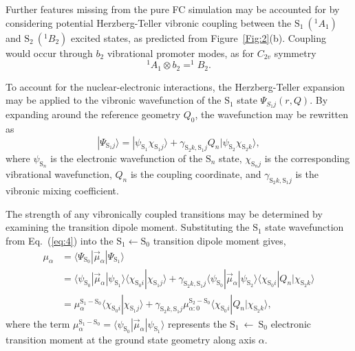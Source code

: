 \documentclass[journal=jpcafh,manuscript=article,layout=onecolumn, 12pt]{achemso}
\begin{document}
Further features missing from the pure FC simulation may be accounted for by considering potential Herzberg-Teller vibronic coupling between the $\text{S}_1~(^1A_1)$ and $\text{S}_2~(^1B_2)$ excited states, as predicted from Figure~\ref{Fig:2}(b). Coupling would occur through $b_2$ vibrational promoter modes, as for $C_{2v}$ symmetry
\begin{equation}
^1A_1 \otimes b_2 = ^1B_2.
\label{eq:3}
\end{equation}

To account for the nuclear-electronic interactions, the Herzberg-Teller expansion may be applied to the vibronic wavefunction of the $\text{S}_1$ state $\Psi_{S_1j}(r,Q)$. By expanding around the reference geometry $Q_0$, the wavefunction may be rewritten as 
\begin{equation}
|\Psi_{\text{S}_1j} \rangle = |\psi_{\text{S}_1} \chi_{\text{S}_1j} \rangle + \gamma_{\text{S}_2k,\text{S}_1j}Q_n|\psi_{\text{S}_2} \chi_{\text{S}_2k}\rangle, 
\label{eq:4}
\end{equation}
where $\psi_{\text{S}_n}$ is the electronic wavefunction of the $\text{S}_n$ state, $\chi_{\text{S}_nj}$ is the corresponding vibrational wavefunction, $Q_n$ is the coupling coordinate, and $\gamma_{\text{S}_2k,\text{S}_1j}$ is the vibronic mixing coefficient.

The strength of any vibronically coupled transitions may be determined by examining the
transition dipole moment. Substituting the $\text{S}_1$ state wavefunction from Eq.~(\ref{eq:4}) into the $\text{S}_1\leftarrow \text{S}_0$ transition dipole moment gives,
\begin{align}
\mu_{\alpha}&=\langle\Psi_{\text{S}_0}|\vec{\mu}_{\alpha}|\Psi_{\text{S}_1}\rangle\\
&=\langle\psi_{\text{S}_0}|\vec{\mu}_{\alpha}|\psi_{\text{S}_1}\rangle\langle\chi_{\text{S}_0i}|\chi_{\text{S}_1j}\rangle +
\gamma_{\text{S}_2k,\text{S}_1j}\langle\psi_{\text{S}_0}|\vec{\mu}_{\alpha}|\psi_{\text{S}_2}\rangle\langle\chi_{\text{S}_0i}|Q_n|\chi_{\text{S}_2k}\rangle\\
&=\mu_{\alpha}^{\text{S}_1-\text{S}_0}\langle\chi_{\text{S}_0i}|\chi_{\text{S}_1j}\rangle + \gamma_{\text{S}_2k,\text{S}_1j}\mu_{\alpha:0}^{\text{S}_2-\text{S}_0}\langle\chi_{\text{S}_0i}|Q_n|\chi_{\text{S}_2k}\rangle,
\label{eq:5}
\end{align}
where the term $\mu_{\alpha}^{\text{S}_1-\text{S}_0}= \langle\psi_{\text{S}_0}|\vec{\mu}_{\alpha}|\psi_{\text{S}_1}\rangle$ represents the $\text{S}_1~\leftarrow~\text{S}_0$ electronic transition moment at the ground state geometry along axis $\alpha$.
\end{document}

